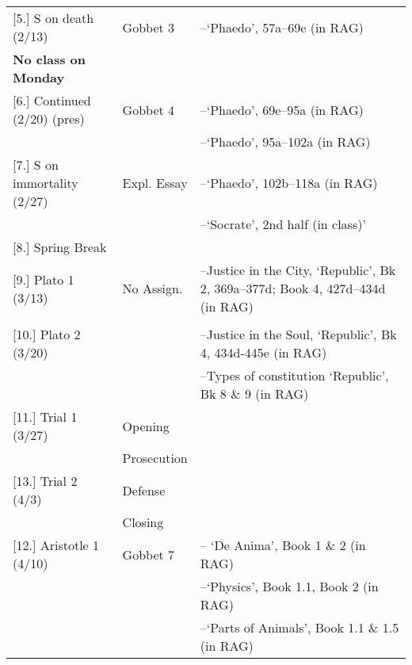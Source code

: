 \documentclass[article,oneside]{memoir}
\begin{document}
\begin{center}
\begin{longtable}{p{4.5cm}p{2cm}p{4.5cm}}
[5.] S on death  (2/13)			& Gobbet 3	    	 & --`Phaedo', 57a--69e (in RAG) \\
\textbf{No class on Monday}						 & 			      & \\ [1.8\baselineskip]  \hline %

[6.] Continued (2/20) (pres) 		& 	Gobbet 4          & --`Phaedo', 69e--95a  (in RAG)   \\
						        & 				 & --`Phaedo', 95a--102a  (in RAG) \\ [1.8\baselineskip] \hline
  
[7.] S on immortality (2/27)	  	& Expl. Essay		 & --`Phaedo', 102b--118a  (in RAG)   \\
							& 				 & --`Socrate', 2nd half (in class)' \\ [1.8\baselineskip] \hline

[8.] Spring Break				& 				 &  					\\ [1.8\baselineskip]	\hline
				     			 

[9.] Plato 1 (3/13)				& No Assign.			&  --Justice in the City, `Republic', Bk 2, 369a--377d; Book 4, 427d--434d (in RAG) \\ 
							& 	        				&  \\ 
				     			 

[10.] Plato 2 (3/20)				& 					&   --Justice in the Soul, `Republic', Bk 4, 434d-445e (in RAG) \\
	         					& 					& --Types of constitution `Republic', Bk 8 \& 9 (in RAG)   \\  [1.8\baselineskip] \hline
	

[11.] Trial 1 (3/27)				&  Opening					&  \\
						    	&  Prosecution					&  \\  [1.8\baselineskip] \hline
                                    

[13.] Trial 2  (4/3)				& Defense            		  	&  \\ 
			    				& Closing					&  \\ [1.8\baselineskip] \hline



[12.] Aristotle 1	(4/10)				& Gobbet 7			& -- `De Anima', Book 1 \& 2 (in RAG)  \\
						    	&  					& --`Physics', Book 1.1, Book 2 (in RAG) \\
							&					& --`Parts of Animals', Book 1.1 \& 1.5 (in RAG)	 \\ [1.8\baselineskip] \hline
                                    

\end{longtable}
\end{center}
\end{document}
